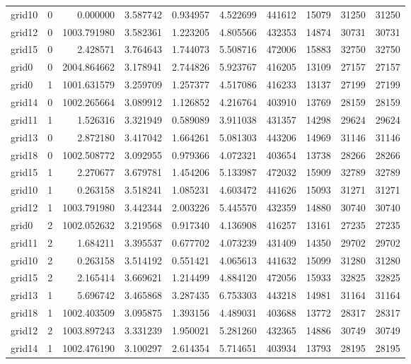 \begin{longtable}{|l|r|r|r|r|r|r|r|r|r|}
grid10 & 0 & 0.000000 & 3.587742 & 0.934957 & 4.522699 & 441612 & 15079 & 31250 & 31250 \\
grid12 & 0 & 1003.791980 & 3.582361 & 1.223205 & 4.805566 & 432353 & 14874 & 30731 & 30731 \\
grid15 & 0 & 2.428571 & 3.764643 & 1.744073 & 5.508716 & 472006 & 15883 & 32750 & 32750 \\
grid0 & 0 & 2004.864662 & 3.178941 & 2.744826 & 5.923767 & 416205 & 13109 & 27157 & 27157 \\
grid0 & 1 & 1001.631579 & 3.259709 & 1.257377 & 4.517086 & 416233 & 13137 & 27199 & 27199 \\
grid14 & 0 & 1002.265664 & 3.089912 & 1.126852 & 4.216764 & 403910 & 13769 & 28159 & 28159 \\
grid11 & 1 & 1.526316 & 3.321949 & 0.589089 & 3.911038 & 431357 & 14298 & 29624 & 29624 \\
grid13 & 0 & 2.872180 & 3.417042 & 1.664261 & 5.081303 & 443206 & 14969 & 31146 & 31146 \\
grid18 & 0 & 1002.508772 & 3.092955 & 0.979366 & 4.072321 & 403654 & 13738 & 28266 & 28266 \\
grid15 & 1 & 2.270677 & 3.679781 & 1.454206 & 5.133987 & 472032 & 15909 & 32789 & 32789 \\
grid10 & 1 & 0.263158 & 3.518241 & 1.085231 & 4.603472 & 441626 & 15093 & 31271 & 31271 \\
grid12 & 1 & 1003.791980 & 3.442344 & 2.003226 & 5.445570 & 432359 & 14880 & 30740 & 30740 \\
grid0 & 2 & 1002.052632 & 3.219568 & 0.917340 & 4.136908 & 416257 & 13161 & 27235 & 27235 \\
grid11 & 2 & 1.684211 & 3.395537 & 0.677702 & 4.073239 & 431409 & 14350 & 29702 & 29702 \\
grid10 & 2 & 0.263158 & 3.514192 & 0.551421 & 4.065613 & 441632 & 15099 & 31280 & 31280 \\
grid15 & 2 & 2.165414 & 3.669621 & 1.214499 & 4.884120 & 472056 & 15933 & 32825 & 32825 \\
grid13 & 1 & 5.696742 & 3.465868 & 3.287435 & 6.753303 & 443218 & 14981 & 31164 & 31164 \\
grid18 & 1 & 1002.403509 & 3.095875 & 1.393156 & 4.489031 & 403688 & 13772 & 28317 & 28317 \\
grid12 & 2 & 1003.897243 & 3.331239 & 1.950021 & 5.281260 & 432365 & 14886 & 30749 & 30749 \\
grid14 & 1 & 1002.476190 & 3.100297 & 2.614354 & 5.714651 & 403934 & 13793 & 28195 & 28195 \\

\end{longtable}

